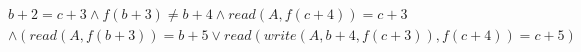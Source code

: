 \begin{align*}
%
& %
b + 2 = c + 3
%
\land
%
f(b + 3)  \neq  b + 4
%
\land
%
\mathit{read}(A,f(c + 4)) = c + 3
~\\~
& %
%
\land
%
(\mathit{read}(A,f(b + 3)) = b + 5 \lor \mathit{read}(\mathit{write}(A,b + 4,f(c + 3)),f(c + 4)) = c + 5)
%
\end{align*}
